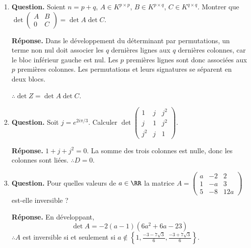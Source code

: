 \documentclass[12pt, a4paper]{article}
\begin{document}
\begin{enumerate}[label=5.\arabic*., start=54]
\begin{minipage}[t]{\linewidth}
\begin{enumerate}[\arabic*.]
\end{enumerate}
\end{minipage}

  \item \begin{minipage}[t]{\linewidth}\raggedright
\textbf{Question.} Soient $n=p+q$, $A\in K^{p\times p}$, $B\in K^{p\times q}$, $C\in K^{q\times q}$. Montrer que $\det\begin{pmatrix}A&B\\0&C\end{pmatrix}=\det A\det C$.
\par\smallskip
\textbf{Réponse.} Dans le développement du déterminant par permutations, un terme non nul doit associer les $q$ dernières lignes aux $q$ dernières colonnes, car le bloc inférieur gauche est nul.
    Les $p$ premières lignes sont donc associées aux $p$ premières colonnes.
    Les permutations et leurs signatures se séparent en deux blocs.

    $\therefore \det Z=\det A\det C$.
\end{minipage}

  \item \begin{minipage}[t]{\linewidth}\raggedright
\textbf{Question.} Soit $j=e^{2i\pi/3}$. Calculer $\displaystyle\det\begin{pmatrix}1&j&j^2\\j&1&j^2\\j^2&j&1\end{pmatrix}$.
\par\smallskip
\textbf{Réponse.} $1+j+j^2=0$. La somme des trois colonnes est nulle, donc les colonnes sont liées.
    $\therefore D=0$.
\end{minipage}

  \item \begin{minipage}[t]{\linewidth}\raggedright
\textbf{Question.} Pour quelles valeurs de $a\in\RR$ la matrice $\displaystyle A=\begin{pmatrix}a&-2&2\\1&-a&3\\5&-8&12a\end{pmatrix}$ est-elle inversible ?
\par\smallskip
\textbf{Réponse.} En développant,
    \[
      \det A=-2(a-1)(6a^2+6a-23)
    \]
    $\therefore A$ est inversible si et seulement si
    $\displaystyle a\notin\left\{1,\frac{-3-7\sqrt3}{6},\frac{-3+7\sqrt3}{6}\right\}$.
\end{minipage}


\end{enumerate}
\end{document}
